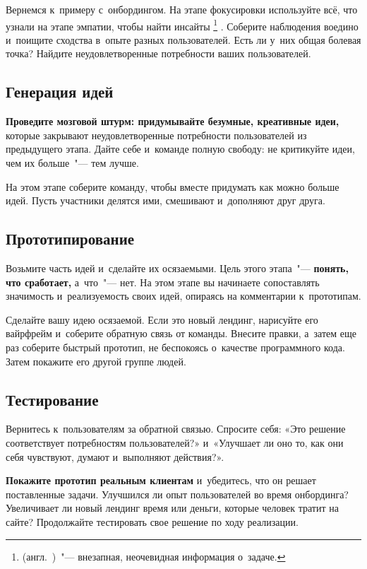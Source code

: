 \documentclass[12pt]{article}
\begin{document}
Вернемся к~примеру с~онбордингом. На этапе фокусировки
используйте всё, что узнали на этапе эмпатии, чтобы найти
инсайты%
\footnote{%
	 (англ.~)~"--- внезапная, неочевидная
	информация о~задаче.%
}%
.
Соберите наблюдения воедино и~поищите сходства в~опыте разных пользователей. Есть ли у~них общая болевая точка? Найдите неудовлетворенные потребности ваших пользователей. 

\subsection*{Генерация идей}
\textbf{Проведите мозговой штурм: придумывайте безумные, креативные идеи,} которые закрывают неудовлетворенные потребности пользователей из предыдущего этапа. Дайте себе и~команде полную свободу: не критикуйте идеи, чем их больше~"--- тем лучше.

На этом этапе соберите команду, чтобы вместе придумать как можно больше идей. Пусть участники делятся ими, смешивают и~дополняют друг друга.

\subsection*{Прототипирование}
Возьмите часть идей и~сделайте их осязаемыми. Цель этого этапа~"--- \textbf{понять, что сработает,} а~что~"--- нет. На этом этапе вы начинаете сопоставлять значимость и~реализуемость своих идей, опираясь на комментарии к~прототипам. 

Сделайте вашу идею осязаемой. Если это новый лендинг, нарисуйте его вайрфрейм и~соберите обратную связь от команды. Внесите правки, а~затем еще раз соберите быстрый прототип, не беспокоясь о~качестве программного кода. Затем покажите его другой группе людей.  

\subsection*{Тестирование}
Вернитесь к~пользователям за обратной связью. Спросите себя: «Это решение соответствует потребностям пользователей?» и~«Улучшает ли оно то, как они себя чувствуют, думают и~выполняют действия?».

\textbf{Покажите прототип реальным клиентам} и~убедитесь, что он решает поставленные задачи. Улучшился ли опыт пользователей во время онбординга? Увеличивает ли новый лендинг время или деньги, которые человек тратит на сайте? Продолжайте тестировать свое решение по ходу реализации.
\end{document}
